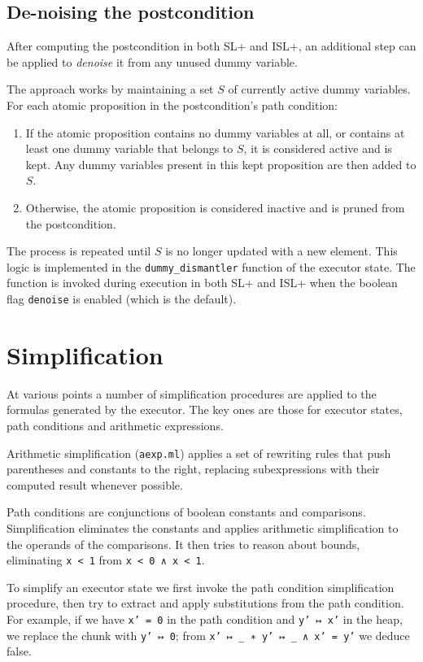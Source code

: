 \documentclass[parskip=half]{scrartcl}
\begin{document}
\subsection{De-noising the postcondition}
After computing the postcondition in both SL+ and ISL+, an additional step can be applied to \textit{denoise} it from any unused dummy variable.

The approach works by maintaining a set $S$ of currently active dummy variables. For each atomic proposition in the postcondition's path condition:
\begin{enumerate}
\item If the atomic proposition contains no dummy variables at all, or contains at least one dummy variable that belongs to $S$, it is considered active and is kept. Any dummy variables present in this kept proposition are then added to $S$.
\item Otherwise, the atomic proposition is considered inactive and is pruned from the postcondition.
\end{enumerate}
The process is repeated until $S$ is no longer updated with a new element.
This logic is implemented in the \texttt{dummy\_dismantler} function of the executor state. The function is invoked during execution in both SL+ and ISL+ when the boolean flag \texttt{denoise} is enabled (which is the default).

\section{Simplification}

At various points a number of simplification procedures are applied to the formulas generated by the executor. The key ones are those for executor states, path conditions and arithmetic expressions.

Arithmetic simplification (\texttt{aexp.ml}) applies a set of rewriting rules that push parentheses and constants to the right, replacing subexpressions with their computed result whenever possible.

Path conditions are conjunctions of boolean constants and comparisons. Simplification eliminates the constants and applies arithmetic simplification to the operands of the comparisons. It then tries to reason about bounds, \eg eliminating \texttt{x < 1} from \texttt{x < 0 ∧ x < 1}. %

To simplify an executor state we first invoke the path condition simplification procedure, then try to extract and apply substitutions from the path condition. For example, if we have \texttt{x' = 0} in the path condition and \texttt{y' ↦ x'} in the heap, we replace the chunk with \texttt{y' ↦ 0}; from \texttt{x' ↦ \_ ∗ y' ↦ \_ ∧ x' = y'} we deduce false.
\end{document}
